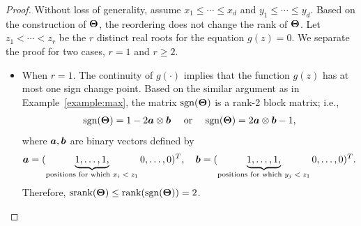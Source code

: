 \documentclass[11pt]{article}
\newcommand*{\KeepStyleUnderBrace}[1]{%
\mathop{%
\mathchoice
{\underbrace{\displaystyle#1}}%
{\underbrace{\textstyle#1}}%
{\underbrace{\scriptstyle#1}}%
{\underbrace{\scriptscriptstyle#1}}%
}\limits
}
\theoremstyle{plain}
\theoremstyle{definition}
\def\sign{\textup{sgn}}
\def\srank{\textup{srank}}
\def\rank{\textup{rank}}
\begin{document}
\begin{proof} 
Without loss of generality, assume $x_1\leq \cdots\leq x_d$ and $y_1\leq \cdots \leq y_d$. Based on the construction of $\bm{\Theta}$, the reordering does not change the rank of $\bm{\Theta}$. Let $z_1<\cdots<z_r$ be the $r$ distinct real roots for the equation $g(z)=0$. We separate the proof for two cases, $r=1$ and $r\geq 2$. 

\begin{itemize}
\item When $r=1$. The continuity of $g(\cdot)$ implies that the function $g(z)$ has at most one sign change point. Based on the similar argument as in Example~\ref{example:max}, the matrix $\sign(\mTheta)$ is a rank-2 block matrix; i.e., 
\begin{align}
\sign(\mTheta)=1-2\ma\otimes \mb \quad \text{ or } \quad \sign(\mTheta) = 2\ma\otimes\mb -1,
\end{align}
where $\bm{a}, \bm{b}$ are binary vectors defined by
\[
\ma=(\KeepStyleUnderBrace{1,\ldots,1,}_{\text{positions for which $x_{i}<z_1$}}0,\ldots,0)^T,\quad\mb=(\KeepStyleUnderBrace{1,\ldots,1,}_{\text{positions for which $y_j<z_1$}}0,\ldots,0)^T.
\]
Therefore, $\srank(\mTheta)\leq \rank(\sign(\mTheta)) = 2$. 


\end{itemize}
\end{proof}
\end{document}
